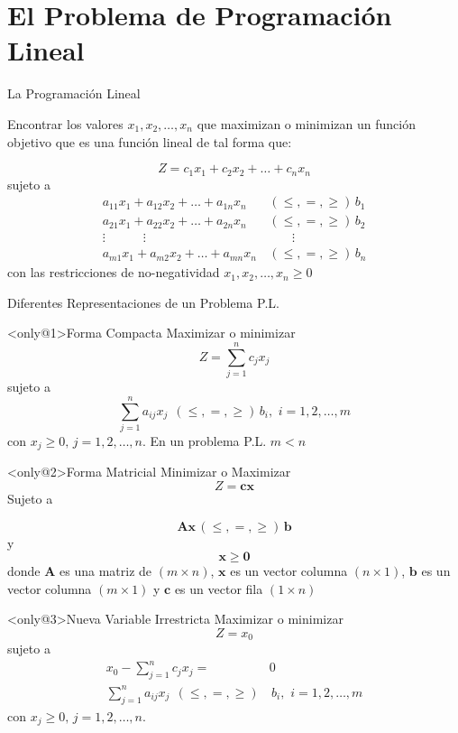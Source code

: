 
\section{El Problema de Programación Lineal}
\label{sec:lpp-problem}


\begin{frame}{La Programación Lineal}
  
  Encontrar los valores $x_1, x_2, \ldots, x_n$ que maximizan o minimizan un función objetivo que es una función lineal de tal forma que:

  \[ Z = c_1x_1 + c_2x_2 + \ldots + c_n x_n\]
  sujeto a
  \begin{align*}
    a_{11}x_1 + a_{12}x_2 +  \ldots + a_{1n}x_n & \, (\leq, =, \geq)\, b_1\\
    a_{21}x_1 + a_{22}x_2 +  \ldots + a_{2n}x_n &\, (\leq, =, \geq)\, b_2\\
    \vdots   \quad\quad\quad \vdots   \quad\quad\quad  & \quad\quad \vdots\\
    a_{m1}x_1 + a_{m2}x_2 + \ldots + a_{mn}x_n & \, (\leq, =, \geq)\, b_n
  \end{align*}
  con las restricciones de no-negatividad $x_1, x_2, \ldots, x_n \geq 0$
\end{frame}

\begin{frame}{Diferentes Representaciones de un Problema P.L.}
  
  \begin{block}<only@1>{Forma Compacta} \justifying
      Maximizar o minimizar \[ Z = \sum_{j=1}^{n} c_jx_j\]
      sujeto a \[ \sum_{j=1}^{n} a_{ij}x_j \,\; (\leq, =, \geq) \, b_i, \,\, i = 1, 2, \ldots, m \]
      con $x_j \geq 0, \, j = 1, 2, \ldots, n$. \alert{En un problema P.L. $m < n$}
    \end{block}
    
    \begin{block}<only@2>{Forma Matricial}\justifying
      Minimizar o Maximizar \[Z = \bm{cx}\]
      Sujeto a

      \[ \bm{Ax} \, (\leq, =, \geq) \, \bm{b}\]
      y \[ \bm{x} \geq \bm{0}\]
      donde $\bm{A}$ es una matriz de $(m  \times n)$, $\bm{x}$ es un vector columna $(n \times 1)$, $\bm{b}$ es un vector columna $(m \times 1)$ y $\bm{c}$ es un vector fila $(1 \times n)$
    \end{block}

      \begin{block}<only@3>{Nueva Variable Irrestricta} \justifying
      Maximizar o minimizar \[ Z = x_0\]
      sujeto a
      \begin{align*}
        x_0 - \sum_{j=1}^{n} c_jx_j =& 0\\
        \sum_{j=1}^{n} a_{ij}x_j \,\; (\leq, =, \geq)& \, b_i, \,\, i = 1, 2, \ldots, m
      \end{align*}
      con $x_j \geq 0, \, j = 1, 2, \ldots, n$. 
    \end{block}
\end{frame}

